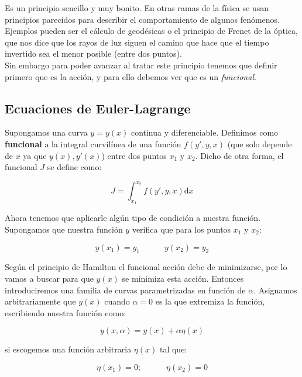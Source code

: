\documentclass[12pt,a4paper]{book}
\newcommand{\D}{\mathrm{d}}
\newcommand{\tquad}{\quad \quad \quad}
\begin{document}
Es un principio sencillo y muy bonito. En otras ramas de la física se usan principios parecidos para describir el comportamiento de algunos fenómenos. Ejemplos pueden ser el cálculo de geodésicas o el principio de Frenet de la óptica, que nos dice que los rayos de luz siguen el camino que hace que el tiempo invertido sea el menor posible (entre dos puntos). \\

Sin embargo para poder avanzar al tratar este principio tenemos que definir primero que es la acción, y para ello debemos ver que es un \textit{funcional}.

\subsection{Ecuaciones de Euler-Lagrange}

Supongamos una curva $y=y(x)$ continua y diferenciable. Definimos como \textbf{funcional} a la integral curvilínea de una función $f(y',y,x)$ (que solo depende de $x$ ya que $y(x),y'(x)$) entre dos puntos $x_1$ y $x_2$. Dicho de otra forma, el funcional $J$ se define como:

\begin{equation}
J = \int_{x_1}^{x_2} f(y',y,x) \D x 
\end{equation}

Ahora tenemos que aplicarle algún tipo de condición a nuestra función. Supongamos que nuestra función $y$ verifica que para los puntos $x_1$ y $x_2$:

\begin{equation}
y(x_1) = y_1 \tquad y(x_2) = y_2
\end{equation}

Según el principio de Hamilton el funcional acción debe de minimizarse, por lo vamos a buscar para que $y(x)$ se minimiza esta acción. Entonces introduciremos una familia de curvas parametrizadas en función de $\alpha$. Asignamos arbitrariamente que $y(x)$ cuando $\alpha=0$ es la que extremiza la función, escribiendo nuestra función como:

\begin{equation}
y (x,\alpha) = y(x) + \alpha \eta (x)
\end{equation}

si escogemos una función arbitraria $\eta(x)$ tal que:

\begin{equation}
\eta (x_1) = 0; \tquad \eta(x_2) = 0
\end{equation}
\end{document}
